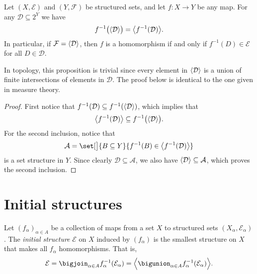 \documentclass[article, a4paper, 11pt, oneside]{memoir}
\numberwithin{equation}{chapter}
\newcommand{\calE}{\mathcal{E}}
\newcommand{\calD}{\mathcal{D}}
\newcommand{\calF}{\mathcal{F}}
\newcommand{\calA}{\mathcal{A}}
\DeclarePairedDelimiter{\gen}{\langle}{\rangle} %
\begin{document}
\begin{proposition}
    \label{thm:preimage_and_generation_commute}
    Let $(X,\calE)$ and $(Y,\calF)$ be structured sets, and let $f \colon X \to Y$ be any map. For any $\calD \subseteq 2^Y$ we have
    \begin{equation*}
        f^{-1}\bigl( \gen{\calD} \bigr) = \gen[\big]{f^{-1}(\calD)}.
    \end{equation*}
    In particular, if $\calF = \gen{\calD}$, then $f$ is a homomorphism if and only if $f^{-1}(D) \in \calE$ for all $D \in \calD$.
\end{proposition}
%
In topology, this proposition is trivial since every element in $\gen{\calD}$ is a union of finite intersections of elements in $\calD$. The proof below is identical to the one given in measure theory.

\begin{proof}
    First notice that $f^{-1}(\calD) \subseteq f^{-1}(\gen{\calD})$, which implies that
    \begin{equation*}
        \gen[\big]{f^{-1}(\calD)} \subseteq f^{-1}\bigl( \gen{\calD} \bigr).
    \end{equation*}
    For the second inclusion, notice that
    \begin{equation*}
        \calA = \set[\big]{B \subseteq Y}{f^{-1}(B) \in \gen[\big]{f^{-1}(\calD)}}
    \end{equation*}
    is a set structure in $Y$. Since clearly $\calD \subseteq \calA$, we also have $\gen{\calD} \subseteq \calA$, which proves the second inclusion.
\end{proof}


\section{Initial structures}

\begin{definition}
    Let $(f_\alpha)_{\alpha \in A}$ be a collection of maps from a set $X$ to structured sets $(X_\alpha, \calE_\alpha)$. The \emph{initial structure} $\calE$ on $X$ induced by $(f_\alpha)$ is the smallest structure on $X$ that makes all $f_\alpha$ homomorphisms. That is,
    \begin{equation*}
        \calE
            = \bigjoin_{\alpha \in A} f_\alpha^{-1}(\calE_\alpha)
            = \gen[\Big]{ \bigunion_{\alpha \in A} f_\alpha^{-1}(\calE_\alpha) }.
    \end{equation*}
\end{definition}
\end{document}
